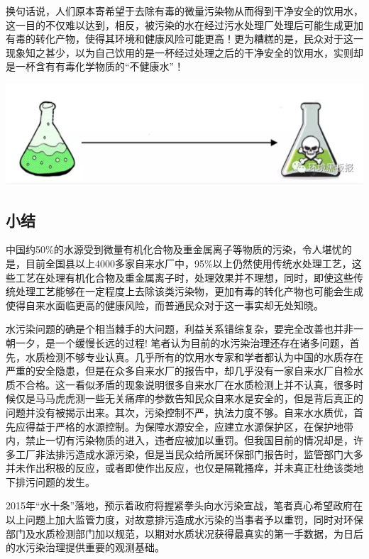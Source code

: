 \documentclass[]{book}
\begin{document}
换句话说，人们原本寄希望于去除有毒的微量污染物从而得到干净安全的饮用水，这一目的不仅难以达到，相反，被污染的水在经过污水处理厂处理后可能生成更加有毒的转化产物，使得其环境和健康风险可能更高！更为糟糕的是，民众对于这一现象知之甚少，以为自己饮用的是一杯经过处理之后的干净安全的饮用水，实则却是一杯含有有毒化学物质的``不健康水''！

\includegraphics[width=8.33in]{images/dushui4}

\subsection{小结}

中国约50\%的水源受到微量有机化合物及重金属离子等物质的污染，令人堪忧的是，目前全国县以上4000多家自来水厂中，95\%以上仍然使用传统水处理工艺，这些工艺在处理有机化合物及重金属离子时，处理效果并不理想，同时，即使这些传统处理工艺能够在一定程度上去除该类污染物，更加有毒的转化产物也可能会生成使得自来水面临更高的健康风险，而普通民众对于这一事实却无处知晓。

水污染问题的确是个相当棘手的大问题，利益关系错综复杂，要完全改善也并非一朝一夕，是一个缓慢长远的过程!
笔者认为目前的水污染治理还存在诸多问题，首先，水质检测不够专业认真。几乎所有的饮用水专家和学者都认为中国的水质存在严重的安全隐患，但是在众多自来水厂的报告中，却几乎没有一家自来水厂自检水质不合格。这一看似矛盾的现象说明很多自来水厂在水质检测上并不认真，很多时候仅是马马虎虎测一些无关痛痒的参数告知民众自来水是安全的，但是背后真正的问题并没有被揭示出来。其次，污染控制不严，执法力度不够。自来水水质优，首先应得益于严格的水源控制。为保障水源安全，应建立水源保护区，在保护地带内，禁止一切有污染物质的进入，违者应被加以重罚。但我国目前的情况却是，许多工厂非法排污造成水源污染，但是当民众给所属环保部门报告时，监管部门大多并未作出积极的反应，或者即使作出反应，也仅是隔靴搔痒，并未真正杜绝该类地下排污问题的发生。

2015年``水十条''落地，预示着政府将握紧拳头向水污染宣战，笔者真心希望政府在以上问题上加大监管力度，对故意排污造成水污染的当事者予以重罚，同时对环保部门及水质检测部门加以规范，以期对水质状况获得最真实的第一手数据，为日后的水污染治理提供重要的观测基础。
\end{document}
